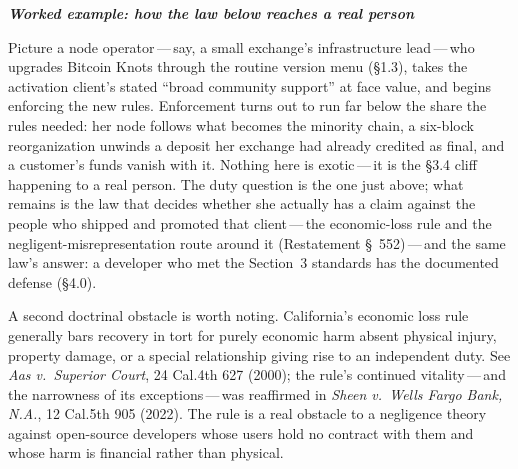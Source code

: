\documentclass[11pt, twoside, openright]{book}
\newcommand{\sect}[1]{\S#1}
\newcommand{\peheader}[1]{{\itshape\bfseries #1}\par\vspace{4pt}}
\begin{document}
\needspace{1.6in}
\begin{plainenglish}
\peheader{Worked example: how the law below reaches a real person}
Picture a node operator\,---\,say, a small exchange's infrastructure lead\,---\,who upgrades Bitcoin Knots through the routine version menu (\sect{1.3}), takes the activation client's stated ``broad community support'' at face value, and begins enforcing the new rules. Enforcement turns out to run far below the share the rules needed: her node follows what becomes the minority chain, a six-block reorganization unwinds a deposit her exchange had already credited as final, and a customer's funds vanish with it. Nothing here is exotic\,---\,it is the \sect{3.4} cliff happening to a real person. The duty question is the one just above; what remains is the law that decides whether she actually has a claim against the people who shipped and promoted that client\,---\,the economic-loss rule and the negligent-misrepresentation route around it (Restatement \S~552)\,---\,and the same law's answer: a developer who met the Section~3 standards has the documented defense (\sect{4.0}).
\end{plainenglish}

A second doctrinal obstacle is worth noting. California's economic loss rule generally bars recovery in tort for purely economic harm absent physical injury, property damage, or a special relationship giving rise to an independent duty. See \textit{Aas v.~Superior Court}, 24 Cal.4th 627 (2000); the rule's continued vitality\,---\,and the narrowness of its exceptions\,---\,was reaffirmed in \textit{Sheen v.~Wells Fargo Bank, N.A.}, 12 Cal.5th 905 (2022). The rule is a real obstacle to a negligence theory against open-source developers whose users hold no contract with them and whose harm is financial rather than physical.
\end{document}
